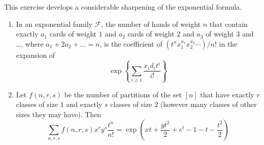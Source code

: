 \begin{exercise}
    This exercise develops a considerable sharpening of the exponential formula.
    \begin{enumerate}[label=(\alph*)]
        \item In an exponential family $\mathcal{F}$, the number of hands of weight $n$ that contain exactly $a_1$ cards of weight $1$ and $a_2$ cards of weight $2$ and $a_3$ of weight $3$ and \ldots, where $a_1+2a_2+\ldots  = n$, is the coefficient of $(t^nx_1^{a_1}x_2^{a_2}\cdots)/n!$ in the expansion of 
        \[
            \exp\left\{\sum_{i\geq 1} \frac{x_id_it^i}{i!}\right\}
        \]
        \item Let $f(n,r,s)$ be the number of partitions of the set $[n]$ that have exactly $r$ classes of size $1$ and exactly $s$ classes of size $2$ (however many classes of other sizes they may have). Then
        \[
            \sum_{n,r,s}f(n,r,s)x^ry^s\frac{t^n}{n!} = \exp\left(xt+\frac{yt^2}{2}+e^t -1-t-\frac{t^2}{2}\right)
        \]
    \end{enumerate}
\end{exercise}
